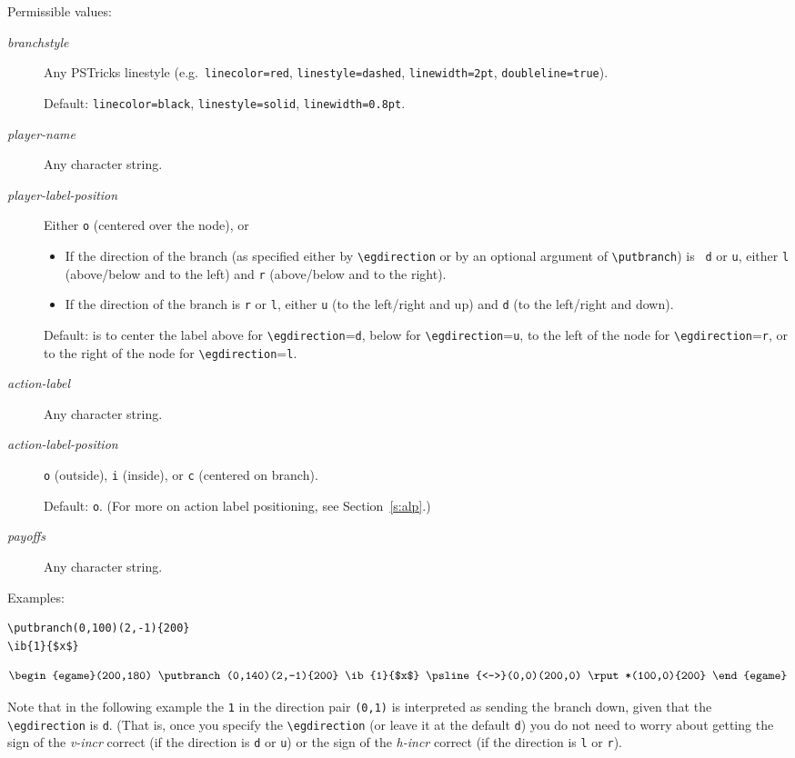 \documentclass[12pt]{article}
\begin{document}
Permissible values:
\begin{description}
\item[\emph{branchstyle}] Any PSTricks linestyle (e.g.\ \verb+linecolor=red+,
\verb+linestyle=dashed+, \verb+linewidth=2pt+, \verb+doubleline=true+).

Default: \verb+linecolor=black+, \verb+linestyle=solid+,
\verb+linewidth=0.8pt+.
\item[\emph{player-name}] Any character string.
\item[\emph{player-label-position}] Either \verb+o+ (centered over the node),
or
\begin{itemize}
   \item If the direction of the branch (as specified either by
\verb+\egdirection+ or by an optional argument of \verb+\putbranch+) is {\tt
d} or {\tt u}, either {\tt l} (above/below and to the left) and {\tt r}
(above/below and to the right).
   \item If the direction of the branch is {\tt r} or {\tt l}, either {\tt u}
(to the left/right and up) and {\tt d} (to the left/right and down). 
\end{itemize}
Default: is to center the label above for \verb+\egdirection+=\verb+d+, below
for \verb+\egdirection+=\verb+u+, to the left of the node for
\verb+\egdirection+=\verb+r+, or to the right of the node for
\verb+\egdirection+=\verb+l+.
\item[\emph{action-label}] Any character string.
\item[\emph{action-label-position}] \verb+o+ (outside), \verb+i+ (inside), or
\verb+c+ (centered on branch).

Default: \verb+o+.  (For more on action label positioning, see
Section~\ref{s:alp}.)
\item[\emph{payoffs}] Any character string.
\end{description}

Examples:
\begin{verbatim}
\putbranch(0,100)(2,-1){200}
\ib{1}{$x$}
\end{verbatim}
$$\begin{egame}(200,180)
\putbranch(0,140)(2,-1){200}
\ib{1}{$x$}
\psline{<->}(0,0)(200,0)
\rput*(100,0){200}
\end{egame}$$

Note that in the following example the \verb+1+ in the direction pair
\verb+(0,1)+ is interpreted as sending the branch down, given that the
\verb+\egdirection+ is \verb+d+.  (That is, once you specify the
\verb+\egdirection+ (or leave it at the default \verb+d+) you do not need to
worry about getting the sign of the \emph{v-incr} correct (if the direction is
\verb+d+ or \verb+u+) or the sign of the \emph{h-incr} correct (if the
direction is \verb+l+ or \verb+r+).
\end{document}
